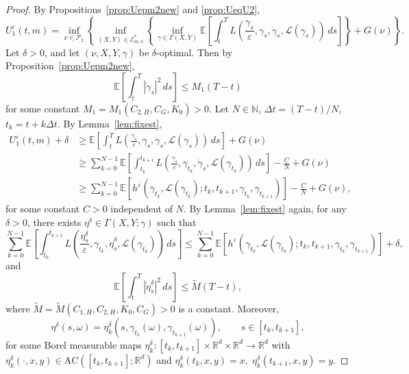 \documentclass[reqno,11pt]{amsart}
\numberwithin{equation}{section}
\newcommand{\e}{\varepsilon}
\newcommand{\ep}{\varepsilon}
\begin{document}
\begin{proof}
    By Propositions~\ref{prop:Uepm2new} and \ref{prop:UeqU2},
    \[
    U_1^\e(t,m)
= \inf_{\nu \in \mathcal{P}_2} \left\{ \inf_{(X, Y) \in \mathcal{E}^\ast_{m,\nu}} \left\{ \inf_{\gamma \in \Gamma(X, Y)} \mathbb{E}\left[\int_{t}^T L\left( \frac{\gamma_s}{\e}, \gamma_s, \dot{\gamma}_s, \mathcal{L}(\gamma_s) \right)\, ds \right] \right\}+G(\nu) \right\}.
    \]
Let $\delta >0$, and let $(\nu,X,Y,\gamma)$ be $\delta$-optimal. Then by Proposition~\ref{prop:Uepm2new},
\begin{equation}\label{eqn:gamdelvelbd}
\mathbb{E}\left[\int_{t}^T|\dot{\gamma}_s|^2 \,ds\right] \leq M_1(T-t)
\end{equation}
for some constant $M_1=M_1(C_{2,H}, C_G, K_0)>0$. Let $N\in\mathbb{N}$, $\Delta t=(T-t)/N$, $t_k=t+k\Delta t$. By Lemma~\ref{lem:fixest},
\begin{equation}\label{eqn:Uep1mul}
\begin{aligned}
U^\varepsilon_1(t,m) +\delta & \geq \mathbb{E}\left[\int_{t}^T L\left( \frac{\gamma_s}{\e}, \gamma_s, \dot{\gamma}_s, \mathcal{L}(\gamma_s) \right)\, ds \right]
+G(\nu)\\
& \geq \sum_{k=0}^{N-1} \mathbb{E} \left[ \int_{t_k}^{t_{k+1}}
L\left(\frac{\gamma_s}{\ep}, \gamma_{t_k}, \dot{\gamma}_s, \mathcal{L}(\gamma_{t_k})\right)\,ds\right]-\frac{C}{N}  +G(\nu)\\
& \geq \sum_{k=0}^{N-1} \mathbb{E} \left[h^\e\left(\gamma_{t_k}, \mathcal{L}(\gamma_{t_k});t_k,t_{k+1},\gamma_{t_k},\gamma_{t_{k+1}}\right)\right]-\frac{C}{N} +G(\nu),
\end{aligned}
\end{equation}
for some constant $C>0$ independent of $N$.
By Lemma~\ref{lem:fixest} again, for any $\delta>0$, there exists
$\eta^{\delta}\in\Gamma(X,Y;\gamma)$ such that
\begin{equation}\label{eqn:eta-piecewise-near-opt}
\sum_{k=0}^{N-1} \mathbb E\left[ \int_{t_k}^{t_{k+1}} L\left( \frac{\eta^\delta_s}{\varepsilon}, \gamma_{t_k}, \dot{\eta}^\delta_s, \mathcal{L}(\gamma_{t_k})\right)\,ds \right] \le \sum_{k=0}^{N-1} \mathbb E\left[ h^\varepsilon\left( \gamma_{t_k}, \mathcal{L}(\gamma_{t_k}); t_k,t_{k+1}, \gamma_{t_k}, \gamma_{t_{k+1}} \right) \right] + \delta,
\end{equation}
and
\begin{equation}\label{eqn:etavelbd}
\mathbb E\left[\int_t^T|\dot\eta_s^\delta|^2\,ds\right]\le \tilde{M}(T-t),
\end{equation}
where $\tilde M= \tilde{M}(C_{1,H},C_{2,H}, K_0, C_G)>0$ is a constant. Moreover,
\[
\eta^\delta(s,\omega)
=
\eta^\delta_k\left(
s,\gamma_{t_k}(\omega),\gamma_{t_{k+1}}(\omega)
\right),
\qquad s\in[t_k,t_{k+1}],
\]
for some Borel measurable maps $\eta^\delta_k:[t_k,t_{k+1}]\times\mathbb R^d\times\mathbb R^d\to\mathbb R^d$ with $\eta^\delta_k(\cdot,x,y)\in \mathrm{AC}([t_k,t_{k+1}];\mathbb R^d)$ and $\eta^\delta_k(t_k,x,y)=x,\; \eta^\delta_k(t_{k+1},x,y)=y$.


\end{proof}
\end{document}
